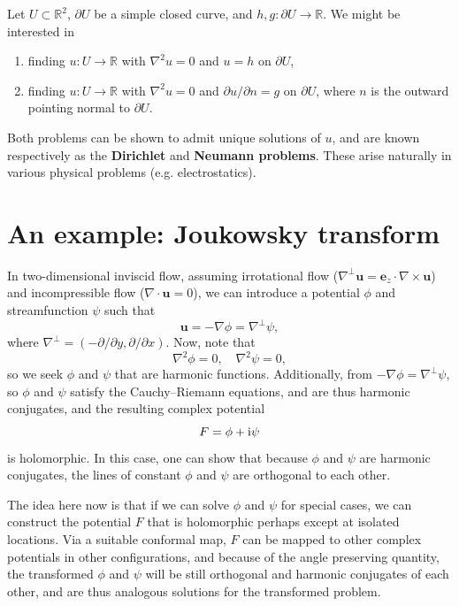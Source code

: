 \documentclass[letter-paper]{tufte-book}
\newcommand{\zi}{{\rm i}}
\begin{document}
Let $U \subset \mathbb{R}^2$, $\partial U$ be a simple closed curve, and $h, g :
\partial U \to \mathbb{R}$. We might be interested in
\begin{enumerate}
  \item finding $u : U \to \mathbb{R}$ with $\nabla^2 u = 0$ and $u = h$ on
  $\partial U$,
  \item finding $u : U \to \mathbb{R}$ with $\nabla^2 u = 0$ and $\partial u /
  \partial n = g$ on $\partial U$, where $n$ is the outward pointing normal to
  $\partial U$.
\end{enumerate}

Both problems can be shown to admit unique solutions of $u$, and are known
respectively as the \textbf{Dirichlet} and \textbf{Neumann problems}. These
arise naturally in various physical problems (e.g. electrostatics).


\section{An example: Joukowsky transform}

In two-dimensional inviscid flow, assuming irrotational flow ($\nabla^\perp
\boldsymbol{u} = \boldsymbol{e}_z\cdot\nabla\times\boldsymbol{u}$) and
incompressible flow ($\nabla\cdot\boldsymbol{u} = 0$), we can introduce a
potential $\phi$ and streamfunction $\psi$ such that
\begin{equation*}
  \boldsymbol{u} = -\nabla \phi = \nabla^\perp \psi,
\end{equation*}
where $\nabla^\perp = (-\partial/\partial y, \partial / \partial x)$. Now, note
that
\begin{equation*}
  \nabla^2 \phi = 0, \quad \nabla^2 \psi = 0,
\end{equation*}
so we seek $\phi$ and $\psi$ that are harmonic functions. Additionally, from
$-\nabla \phi = \nabla^\perp \psi$, so $\phi$ and $\psi$ satisfy the
Cauchy--Riemann equations, and are thus harmonic conjugates, and the resulting
complex potential
\begin{equation*}
  F = \phi + \zi \psi
\end{equation*}
is holomorphic. In this case, one can show that because $\phi$ and $\psi$ are
harmonic conjugates, the lines of constant $\phi$ and $\psi$ are orthogonal to
each other.

The idea here now is that if we can solve $\phi$ and $\psi$ for special cases,
we can construct the potential $F$ that is holomorphic perhaps except at
isolated locations. Via a suitable conformal map, $F$ can be mapped to other
complex potentials in other configurations, and because of the angle preserving
quantity, the transformed $\phi$ and $\psi$ will be still orthogonal and
harmonic conjugates of each other, and are thus analogous solutions for the
transformed problem.
\end{document}
